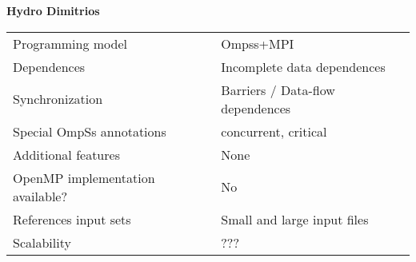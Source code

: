 \section*{}
\label{hydro_dimitrios}
\centering
\Huge
\textbf{Hydro Dimitrios}

\begin{table}[h!]
  \large
  \centering
  \begin{tabular}{|l|l|}
    \hline
    Programming model                & Ompss+MPI \\
    Dependences                      & Incomplete data dependences \\
    Synchronization                  & Barriers / Data-flow dependences \\
    Special OmpSs annotations        & concurrent, critical\\
    Additional features              & None\\
    OpenMP implementation available? & No \\
    References input sets            & Small and large input files \\
    Scalability                      & ??? \\
    \hline
  \end{tabular}
\end{table}

\newpage
